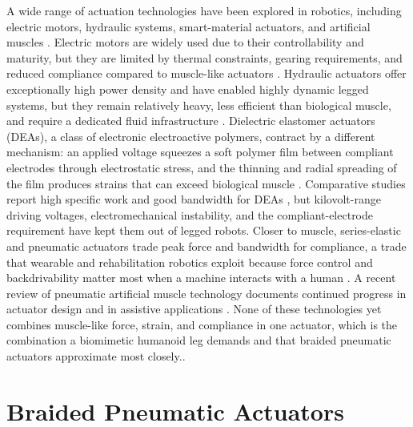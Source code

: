 A wide range of actuation technologies have been explored in robotics, including electric motors, hydraulic systems, smart-material actuators, and artificial muscles \citep{he_mechanism_2020, liang_comparative_2020}. Electric motors are widely used due to their controllability and maturity, but they are limited by thermal constraints, gearing requirements, and reduced compliance compared to muscle-like actuators \citep{veale_towards_2016, suzumori_trends_2018}. Hydraulic actuators offer exceptionally high power density and have enabled highly dynamic legged systems, but they remain relatively heavy, less efficient than biological muscle, and require a dedicated fluid infrastructure \citep{suzumori_trends_2018}. Dielectric elastomer actuators (DEAs), a class of electronic electroactive polymers, contract by a different mechanism: an applied voltage squeezes a soft polymer film between compliant electrodes through electrostatic stress, and the thinning and radial spreading of the film produces strains that can exceed biological muscle \citep{madden_artificial_2004}. Comparative studies report high specific work and good bandwidth for DEAs \citep{liang_comparative_2020}, but kilovolt-range driving voltages, electromechanical instability, and the compliant-electrode requirement have kept them out of legged robots. Closer to muscle, series-elastic and pneumatic actuators trade peak force and bandwidth for compliance, a trade that wearable and rehabilitation robotics exploit because force control and backdrivability matter most when a machine interacts with a human \citep{aksoz_design_2019, leibach_development_2020, li_influence_2020}. A recent review of pneumatic artificial muscle technology documents continued progress in actuator design and in assistive applications \citep{zhagiparova_recent_2025}. None of these technologies yet combines muscle-like force, strain, and compliance in one actuator, which is the combination a biomimetic humanoid leg demands and that braided pneumatic actuators approximate most closely..

\section{Braided Pneumatic Actuators}\label{sec:bg_bpa}

